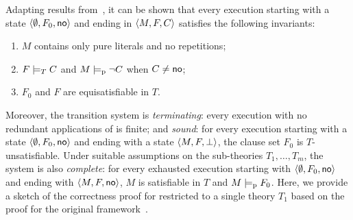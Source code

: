 \documentclass{svjour3}                     %
\begin{document}
Adapting results from~\cite{BarNOT-LPAR-06,KrsGoe-FROCOS-07,NieOT-JACM-06},
it can be shown that every execution 
starting with a state $\state{\emptyset, F_0, \none}$ and
ending in $\state{M,F,C}$ satisfies the following invariants:
\begin{enumerate}
\item $M$ contains only pure literals and no repetitions;
\item $F \ent[T] C$ and $M \pent \lnot C$ when $C \neq \none$;
\item $F_0$ and $F$ are equisatisfiable in $T$.
\end{enumerate}
Moreover, %
the transition system is \emph{terminating}: 
every execution with no redundant applications of  is finite; and
\emph{sound}:
for every execution starting with a state $\state{\emptyset, F_0, \none}$ and 
ending with a state $\state{M, F, \bot}$, 
the clause set $F_0$ is $T$-unsatisfiable.
Under suitable assumptions on the sub-theories $T_1, \ldots, T_m$,
the system is also \emph{complete}:
for every exhausted execution starting with $\state{\emptyset, F_0, \none}$ and 
ending with $\state{M, F, \none}$, $M$ is satisfiable in $T$
and $M \pent F_0$.
%
Here, we provide a sketch of the correctness proof for \dpllts restricted 
to a single theory $T_1$
based on the proof for the original framework~\cite{NieOT-JACM-06}.
\end{document}
